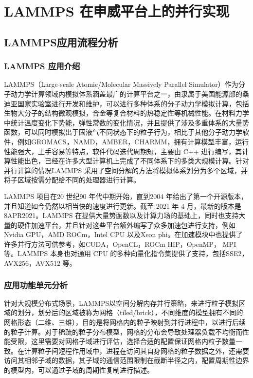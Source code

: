 
\chapter{LAMMPS 在申威平台上的并行实现}

\section{LAMMPS应用流程分析}

\subsection{LAMMPS 应用介绍}
LAMMPS（Large-scale Atomic/Molecular Massively Parallel Simulator）作为分子动力学计算领域内模拟体系涵盖最广的计算平台之一，由隶属于美国能源部的桑迪亚国家实验室进行开发和维护，可以进行多种体系的分子动力学模拟计算，包括生物大分子的结构微观模拟，合金等复合材料的热稳定性等机械性能。在材料力学中统计温度变化下势能，弹性常数的变化情况，并且提供了涉及多重体系的大量势函数，可以同时模拟出于固液气不同状态下的粒子行为，相比于其他分子动力学软件，例如GROMACS\cite{berendsen1995gromacs}，NAMD\cite{phillips2005scalable}，AMBER\cite{pearlman1995amber}，CHARMM\cite{brooks1983charmm}，拥有计算模型丰富，运行性能强大，上手容易等特点，软件代码迭代周期短，主要由 C++ 进行编写，其计算性能出色，已经在许多大型计算机上完成了不同体系下的多类大规模计算。针对并行计算的情况LAMMPS 采用了空间分解的方法将模拟体系划分为多个区域，并将子区域按需分配给不同的处理器进行计算。

LAMMPS 项目在20 世纪90 年代中期开始，直到2004 年给出了第一个开源版本，并且知道如今仍然以相当快的速度进行更新。截至 2021 年 4 月，最新的版本是8APR2021。LAMMPS 在提供大量势函数以及计算力场的基础上，同时也支持大量的硬件加速平台，并且针对这些平台额外编写了众多加速包进行支持，例如Nvidia GPU\cite{hong2009analytical}，AMD ROCm\cite{kuznetsov2019porting}，Intel CPU 以及Xeon phi\cite{chrysos2014intel}。在加速模块中也提供了许多并行方法可供参考，如CUDA，OpenCL，ROCm HIP，OpenMP， MPI 等。LAMMPS 本身也对通用 CPU 的多种向量化指令集提供了支持，包括SSE2\cite{bik2002automatic}，AVX256\cite{lim2018implementation}，AVX512\cite{cornea2015intel} 等。

\subsection{应用功能单元分析}
针对大规模分布式场景，LAMMPS以空间分解内存并行策略，来进行粒子模拟区域的划分，划分后的区域被称为网格（tiled/brick），不同维度的模型拥有不同的网格形态（二维、三维），目的是将网格内的粒子映射到并行进程中，以进行后续的粒子计算。对于稀疏的粒子分布模型，网格的分布会导致处理器负载不均衡而性能受限，这里需要对网格子域进行评估，选择合适的配置保证网格内粒子数量一致。在计算粒子间短程作用域中，进程在访问其自身网格的粒子数据之外，还需要访问其相邻子域的数据，其子域的通信范围限制在截断半径之内，配置周期性边界的模型内，可以通过子域的周期性复制进行描述。

